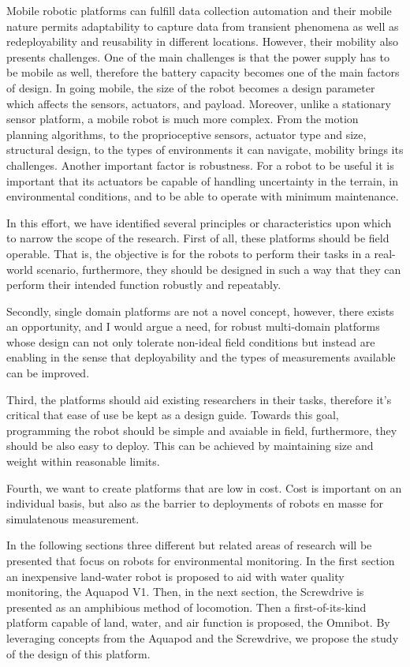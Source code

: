 	Mobile robotic platforms can fulfill data collection automation and their mobile nature permits adaptability to capture data from transient phenomena as well as redeployability and reusability in different locations. However, their mobility also presents challenges. One of the main challenges is that the power supply has to be mobile as well, therefore the battery capacity becomes one of the main factors of design. In going mobile, the size of the robot becomes a design parameter which affects the sensors, actuators, and payload. Moreover, unlike a stationary sensor platform, a mobile robot is much more complex. From the motion planning algorithms, to the proprioceptive sensors, actuator type and size, structural design, to the types of environments it can navigate, mobility brings its challenges. Another important factor is robustness. For a robot to be useful it is important that its actuators be capable of handling uncertainty in the terrain, in environmental conditions, and to be able to operate with minimum maintenance.  


	In this effort, we have identified several principles or characteristics upon which to narrow the scope of the research. First of all, these platforms should be field operable. That is, the objective is for the robots to perform their tasks in a real-world scenario, furthermore, they should be designed in such a way that they can perform their intended function robustly and repeatably. 

	Secondly, single domain platforms are not a novel concept, however, there exists an opportunity, and I would argue a need, for robust multi-domain platforms whose design can not only tolerate non-ideal field conditions but instead are enabling in the sense that deployability and the types of measurements available can be improved. 

	Third, the platforms should aid existing researchers in their tasks, therefore it's critical that ease of use be kept as a design guide. Towards this goal, programming the robot should be simple and avaiable in field, furthermore, they should be also easy to deploy. This can be achieved by maintaining size and weight within reasonable limits. 

	Fourth, we want to create platforms that are low in cost. Cost is important on an individual basis, but also as the barrier to deployments of robots en masse for simulatenous measurement. 

	In the following sections three different but related areas of research will be presented that focus on robots for environmental monitoring. In the first section an inexpensive land-water robot is proposed to aid with water quality monitoring, the Aquapod V1. Then, in the next section, the Screwdrive is presented as an amphibious method of locomotion. Then a first-of-its-kind platform capable of land, water, and air function is proposed, the Omnibot. By leveraging concepts from the Aquapod and the Screwdrive, we propose the study of the design of this platform. 
	
